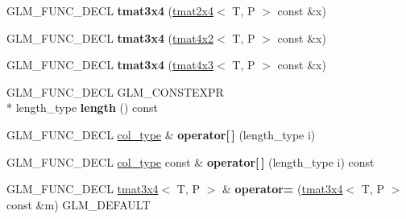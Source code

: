 \begin{DoxyCompactItemize}
\item 
\hypertarget{structglm_1_1tmat3x4_adb7f132c93b8d8fcdbd577898d77f7b8}{G\-L\-M\-\_\-\-F\-U\-N\-C\-\_\-\-D\-E\-C\-L {\bfseries tmat3x4} (\hyperlink{structglm_1_1tmat2x4}{tmat2x4}$<$ T, P $>$ const \&x)}\label{structglm_1_1tmat3x4_adb7f132c93b8d8fcdbd577898d77f7b8}

\item 
\hypertarget{structglm_1_1tmat3x4_a70babe3ae60656b3cbe053ef31327e13}{G\-L\-M\-\_\-\-F\-U\-N\-C\-\_\-\-D\-E\-C\-L {\bfseries tmat3x4} (\hyperlink{structglm_1_1tmat4x2}{tmat4x2}$<$ T, P $>$ const \&x)}\label{structglm_1_1tmat3x4_a70babe3ae60656b3cbe053ef31327e13}

\item 
\hypertarget{structglm_1_1tmat3x4_aadf667324b7352d8aadc7bf0680164e1}{G\-L\-M\-\_\-\-F\-U\-N\-C\-\_\-\-D\-E\-C\-L {\bfseries tmat3x4} (\hyperlink{structglm_1_1tmat4x3}{tmat4x3}$<$ T, P $>$ const \&x)}\label{structglm_1_1tmat3x4_aadf667324b7352d8aadc7bf0680164e1}

\item 
\hypertarget{structglm_1_1tmat3x4_a48a1734a6927d65fe2299a21f8a2985f}{G\-L\-M\-\_\-\-F\-U\-N\-C\-\_\-\-D\-E\-C\-L G\-L\-M\-\_\-\-C\-O\-N\-S\-T\-E\-X\-P\-R \\*
length\-\_\-type {\bfseries length} () const }\label{structglm_1_1tmat3x4_a48a1734a6927d65fe2299a21f8a2985f}

\item 
\hypertarget{structglm_1_1tmat3x4_adba2ef1be4b50bfaa63e5469310f1d87}{G\-L\-M\-\_\-\-F\-U\-N\-C\-\_\-\-D\-E\-C\-L \hyperlink{structglm_1_1tvec4}{col\-\_\-type} \& {\bfseries operator\mbox{[}$\,$\mbox{]}} (length\-\_\-type i)}\label{structglm_1_1tmat3x4_adba2ef1be4b50bfaa63e5469310f1d87}

\item 
\hypertarget{structglm_1_1tmat3x4_ad5df71fd9f9d2cd286395d1d31f07813}{G\-L\-M\-\_\-\-F\-U\-N\-C\-\_\-\-D\-E\-C\-L \hyperlink{structglm_1_1tvec4}{col\-\_\-type} const \& {\bfseries operator\mbox{[}$\,$\mbox{]}} (length\-\_\-type i) const }\label{structglm_1_1tmat3x4_ad5df71fd9f9d2cd286395d1d31f07813}

\item 
\hypertarget{structglm_1_1tmat3x4_abc0355942efae7b2f19e863908c76036}{G\-L\-M\-\_\-\-F\-U\-N\-C\-\_\-\-D\-E\-C\-L \hyperlink{structglm_1_1tmat3x4}{tmat3x4}$<$ T, P $>$ \& {\bfseries operator=} (\hyperlink{structglm_1_1tmat3x4}{tmat3x4}$<$ T, P $>$ const \&m) G\-L\-M\-\_\-\-D\-E\-F\-A\-U\-L\-T}\label{structglm_1_1tmat3x4_abc0355942efae7b2f19e863908c76036}


\end{DoxyCompactItemize}
